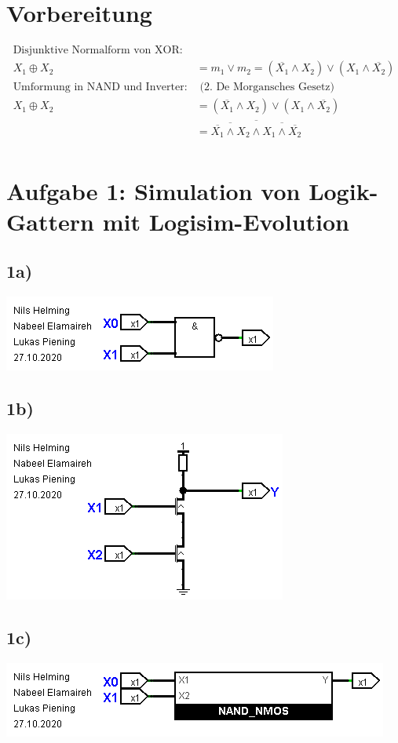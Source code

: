 \documentclass[]{article}
\newcommand{\V}{\lor}
\newcommand{\A}{\land}
\newcommand{\T}[1]{\overline{#1}}
\begin{document}

\section*{Vorbereitung}
	\begin{align*}
		\text{Disjunktive Normalform von XOR:}&\\
		X_1 \oplus X_2 &= m_1 \V m_2 = (\T{X_1} \A X_2) \V (X_1 \A \T{X_2})\\
		\text{Umformung in NAND und Inverter:}&\text{ (2. De Morgansches Gesetz)}\\
		X_1 \oplus X_2 &= (\T{X_1} \A X_2) \V (X_1 \A \T{X_2})\\
		&= \T{\T{\T{X_1} \A X_2} \A \T{X_1 \A \T{X_2}}}\\
	\end{align*}
\section*{Aufgabe 1: Simulation von Logik-Gattern mit Logisim-Evolution}
\subsection*{1a)}
	\begin{center}\includegraphics[scale=0.7]{Bilder/1_a.png}\end{center}
\subsection*{1b)}
	\begin{center}\includegraphics[scale=0.7]{Bilder/1_b.png}\end{center}
\subsection*{1c)}
	\begin{center}\includegraphics[scale=0.7]{Bilder/1_c.png}\end{center}
\end{document}
